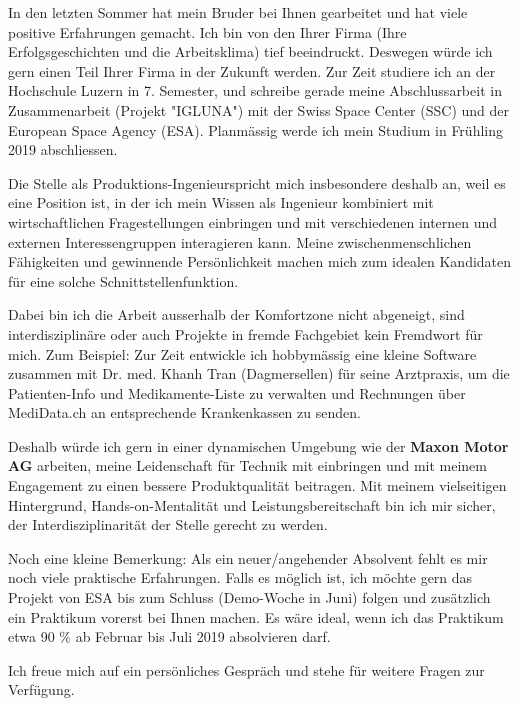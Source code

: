 \documentclass[11pt, a4paper]{awesome-cv}
\newcommand{\companyName}{Maxon Motor AG}
\newcommand{\jobPosition}{Produktions-Ingenieur}
\begin{document}
\makecvheader

\makelettertitle

\begin{cvletter}

In den letzten Sommer hat mein Bruder bei Ihnen gearbeitet und hat viele positive Erfahrungen gemacht. Ich bin von den Ihrer Firma (Ihre Erfolgsgeschichten und die Arbeitsklima) tief beeindruckt. Deswegen würde ich gern einen Teil Ihrer Firma in der Zukunft werden. Zur Zeit studiere ich an der Hochschule Luzern in 7. Semester, und schreibe gerade meine Abschlussarbeit in Zusammenarbeit (Projekt "IGLUNA") mit der Swiss Space Center (SSC) und der European Space Agency (ESA). Planmässig werde ich mein Studium in Frühling 2019 abschliessen.	

Die Stelle als \jobPosition spricht mich insbesondere deshalb an, weil es eine Position ist, in der ich mein Wissen als Ingenieur kombiniert mit wirtschaftlichen Fragestellungen einbringen und mit verschiedenen internen und externen Interessengruppen interagieren kann. Meine zwischenmenschlichen Fähigkeiten und gewinnende Persönlichkeit machen mich zum idealen Kandidaten für eine solche Schnittstellenfunktion.
 
Dabei bin ich die Arbeit ausserhalb der Komfortzone nicht abgeneigt, sind interdisziplinäre oder auch Projekte in fremde Fachgebiet kein Fremdwort für mich. Zum Beispiel: Zur Zeit entwickle ich hobbymässig eine kleine Software zusammen mit Dr. med. Khanh Tran (Dagmersellen) für seine Arztpraxis, um die Patienten-Info und Medikamente-Liste zu verwalten und Rechnungen über MediData.ch an entsprechende Krankenkassen zu senden. 

Deshalb würde ich gern in einer dynamischen Umgebung wie der \textbf{\companyName} arbeiten, meine Leidenschaft für Technik mit einbringen und mit meinem Engagement zu einen bessere Produktqualität beitragen. Mit meinem vielseitigen Hintergrund, Hands-on-Mentalität und Leistungsbereitschaft bin ich mir sicher, der Interdisziplinarität der Stelle gerecht zu werden. 

Noch eine kleine Bemerkung: Als ein neuer/angehender Absolvent fehlt es mir noch viele praktische Erfahrungen. Falls es möglich ist, ich möchte gern das Projekt von ESA bis zum Schluss (Demo-Woche in Juni) folgen und zusätzlich ein Praktikum vorerst bei Ihnen machen. Es wäre ideal, wenn ich das Praktikum etwa 90 \% ab Februar bis Juli 2019 absolvieren darf. 

Ich freue mich auf ein persönliches Gespräch und stehe für weitere Fragen zur Verfügung.

\end{cvletter}

\makeletterclosing
\end{document}
